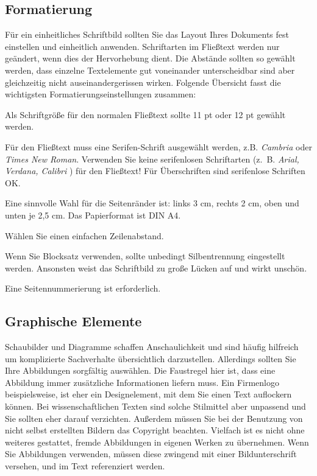\subsection{Formatierung}

Für ein einheitliches Schriftbild sollten Sie das Layout Ihres Dokuments fest einstellen und einheitlich anwenden.
Schriftarten im Fließtext werden nur geändert, wenn dies der Hervorhebung dient.
Die Abstände sollten so gewählt werden, dass einzelne Textelemente gut voneinander unterscheidbar sind aber gleichzeitig nicht \glqq{}auseinandergerissen\grqq{} wirken.
Folgende Übersicht fasst die wichtigsten Formatierungseinstellungen zusammen:
\begin{compactitem}
\item Als Schriftgröße für den normalen Fließtext sollte 11 pt oder 12 pt gewählt werden.
\item Für den Fließtext muss eine Serifen-Schrift ausgewählt werden, z.B. \textit{Cambria} oder \textit{Times New Roman}. \textsf{Verwenden Sie keine serifenlosen Schriftarten (z.~B. \textit{Arial, Verdana, Calibri} ) für den Fließtext!} Für Überschriften sind serifenlose Schriften OK.
\item Eine sinnvolle Wahl für die Seitenränder ist: links 3 cm, rechts 2 cm, oben und unten je 2,5 cm. Das Papierformat ist DIN A4.
\item Wählen Sie einen einfachen Zeilenabstand.
\item Wenn Sie Blocksatz verwenden, sollte unbedingt Silbentrennung eingestellt werden. Ansonsten weist das Schriftbild zu große Lücken auf und wirkt unschön.
\item Eine Seitennummerierung ist erforderlich.
\end{compactitem}

\subsection{Graphische Elemente}


Schaubilder und Diagramme schaffen Anschaulichkeit und sind häufig hilfreich um komplizierte Sachverhalte übersichtlich darzustellen.
Allerdings sollten Sie Ihre Abbildungen sorgfältig auswählen.
Die Faustregel hier ist, dass eine Abbildung immer zusätzliche Informationen liefern muss.
Ein Firmenlogo beispielsweise, ist eher ein Designelement, mit dem Sie einen Text auflockern können.
Bei wissenschaftlichen Texten sind solche Stilmittel aber unpassend und Sie sollten eher darauf verzichten.
Außerdem müssen Sie bei der Benutzung von nicht selbst erstellten Bildern das Copyright beachten.
Vielfach ist es nicht ohne weiteres gestattet, fremde Abbildungen in eigenen Werken zu übernehmen.
Wenn Sie Abbildungen verwenden, müssen diese zwingend mit einer Bildunterschrift versehen, und im Text referenziert werden.


